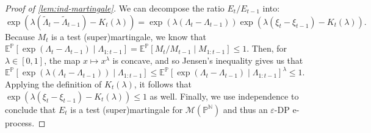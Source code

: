 \documentclass{article}
\newcommand{\Null}{\mathbb{P}}
\newcommand{\E}{\mathbb{E}}
\newcommand{\M}{\mathcal{M}}
\newcommand{\eps}{\varepsilon}
\begin{document}
\begin{proof}[Proof of \cref{lem:ind-martingale}]
    We can decompose the ratio $E_t/E_{t-1}$  into:
    \begin{equation*}
        \exp(\lambda(\tilde \Lambda_t - \tilde\Lambda_{t-1}) - K_t(\lambda)) = \exp(\lambda(\Lambda_t - \Lambda_{t-1})) \exp(\lambda(\xi_t - \xi_{t-1}) - K_t(\lambda)).
    \end{equation*}
    Because $M_t$ is a test (super)martingale, we know that $\E^\Null[\exp(\Lambda_t - \Lambda_{t-1}) \mid \Lambda_{1:t-1}] = \E^\Null[M_t/M_{t-1} \mid M_{1:t-1}] \leq 1$. Then, for $\lambda \in [0,1]$, the map $x \mapsto x^\lambda$ is concave, and so Jensen's inequality gives us that $\E^\Null[\exp(\lambda(\Lambda_t - \Lambda_{t-1})) \mid \Lambda_{1:t-1}] \leq \E^\Null[\exp(\Lambda_t - \Lambda_{t-1}) \mid \Lambda_{1:t-1}]^\lambda \leq 1$. Applying the definition of $K_t(\lambda)$, it follows that $\exp(\lambda(\xi_t - \xi_{t-1}) - K_t(\lambda)) \leq 1$ as well. Finally, we use independence to conclude that $E_t$ is a test (super)martingale for $\M(\Null^\mathbb{N})$ and thus an $\eps$-DP e-process.
\end{proof}

\vspace{1cm}
\end{document}
